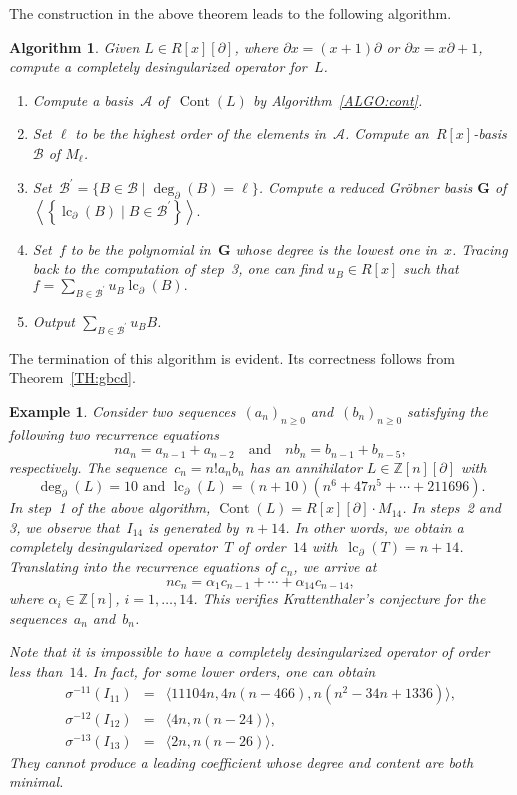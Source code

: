 \documentclass{sig-alternate}
\newcommand{\bZ} { {\mathbb{Z}}}
\newcommand{\cont}{\operatorname{Cont}}
\newcommand{\lc}{\operatorname{lc}}
\newcommand{\si} { {\sigma}}
\newcommand{\pa}{\partial}
\newtheorem{example}[theorem]{Example}
\newtheorem{algo}[theorem]{Algorithm}
\begin{document}
The construction in the above theorem leads to the following algorithm.
\begin{algo}\label{ALGO:cd}
Given $L \in R[x][\pa]$, where $\pa x = (x + 1) \pa$ or $\pa x = x \pa + 1$,
compute a completely desingularized operator for~$L$.
\begin{enumerate}
\item[(1)] Compute a basis~$\mathcal{A}$ of~$\cont(L)$ by  Algorithm~\ref{ALGO:cont}.
 \item[(2)] Set $\ell$ to be the highest order of the elements in~$\mathcal{A}$.
            Compute an~$R[x]$-basis $\mathcal{B}$ of $M_\ell$.
 \item[(3)] Set~$\mathcal{B}^\prime = \{ B \in \mathcal{B} \mid \deg_\pa(B)=\ell\}$.
 Compute a reduced Gr\"obner basis $\mathbf{G}$ of
            $\left\langle \left\{ \lc_\pa(B) \mid B \in \mathcal{B}^\prime \right\}  \right\rangle.$
 \item[(4)] Set~$f$ to be the polynomial in~$\mathbf{G}$ whose degree is the lowest one in~$x$.
            Tracing back to the computation of step~3, one can find $u_B\in R[x]$ such that
            $f = \sum_{B \in \mathcal{B}^\prime} u_B \lc_\pa(B).$
 \item[(5)] Output $\sum_{B \in \mathcal{B}^\prime} u_B B$.
\end{enumerate}
\end{algo}
The termination of this algorithm is evident. Its correctness follows from Theorem~\ref{TH:gbcd}.
\begin{example}\label{Example2}
Consider two sequences~$(a_n)_{n \ge 0}$ and~$(b_n)_{n \ge 0}$ satisfying the following two recurrence equations~\cite{George2015}
\[
 n a_n  =  a_{n - 1} + a_{n - 2} \quad \text{and} \quad
 n b_n =   b_{n - 1} + b_{n - 5},
\]
respectively. The sequence~$c_n = n! a_n b_n$ has an annihilator $L \in \bZ[n][\pa]$  with
$$\deg_\pa(L)=10 \,\, \text{and} \,\, \lc_\pa(L) =  (n+10) (n^6+47 n^5+ \cdots + 211696 ).$$
In step~1 of the above algorithm, $\cont(L) = R[x][\pa]\cdot M_{14}$.
In steps~2 and 3, we observe that~$I_{14}$  is generated by~$n {+} 14 $.
In other words, we obtain a completely desingularized operator~$T$ of order~$14$
with~$\lc_\pa(T) = n + 14$. Translating into the recurrence equations of $c_n$, we arrive at
\[ n c_n = \alpha_1 c_{n - 1} + \cdots + \alpha_{14} c_{n - 14},  \]
where $\alpha_i \in \bZ[n]$, $i = 1, \ldots, 14$.
This verifies Krattenthaler's conjecture for the sequences~$a_n$ and~$b_n$.

Note that it is impossible to have a completely desingularized operator of order less than~$14$.
In fact, for some lower orders, one can obtain
\begin{eqnarray*}
\si^{-11}(I_{11}) & = &\langle 11104n, 4n(n - 466), n(n^2-34n+1336) \rangle, \\
\si^{-12}(I_{12}) & = &\langle 4n, n(n - 24) \rangle, \\
\si^{-13}(I_{13}) & = &\langle 2n, n(n - 26) \rangle.
\end{eqnarray*}
They cannot produce a leading coefficient whose degree and content are both minimal.
\end{example}
\end{document}
